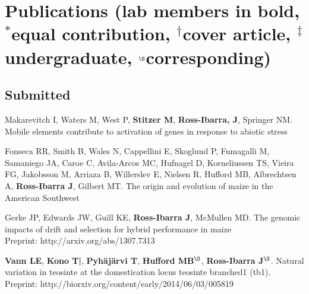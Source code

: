 \documentclass[letterpaper]{article}
\renewenvironment{itemize}{
  \begin{list}{}{
    \setlength{\leftmargin}{1.5em}
  }
}{
  \end{list}
}
\begin{document}
\section*{Publications \small{(lab members in bold, $^*$equal contribution, $^\dagger$cover article, $^\ddagger$undergraduate, $^\S$corresponding)}} 
\subsection*{Submitted}
\begin{itemize}

\item Makarevitch I, Waters M, West P, {\bf Stitzer M}, {\bf Ross-Ibarra, J}, Springer NM. Mobile elements contribute to activation of genes in response to abiotic stress 

\item Fonseca RR, Smith B, Wales N, Cappellini E, Skoglund P, Fumagalli M, Samaniego JA, Caroe C, Avila-Arcos MC, Hufnagel D, Korneliussen TS, Vieira FG, Jakobsson M, Arriaza B, Willerslev E, Nielsen R, Hufford MB, Albrechtsen A,  {\bf Ross-Ibarra J}, Gilbert MT. The origin and evolution of maize in the American Southwest

\item Gerke JP, Edwards JW, Guill KE, {\bf Ross-Ibarra J}, McMullen MD.  The genomic impacts of drift and selection for hybrid performance in maize\\
Preprint: http://arxiv.org/abs/1307.7313


\item {\bf Vann LE}, {\bf Kono T|}, {\bf Pyh\"aj\"arvi T}, {\bf Hufford MB}$^\S$, {\bf Ross-Ibarra J}$^\S$. Natural variation in teosinte at the domestication locus teosinte branched1 (tb1). \\ Preprint: http://biorxiv.org/content/early/2014/06/03/005819


\end{itemize}
\end{document}
